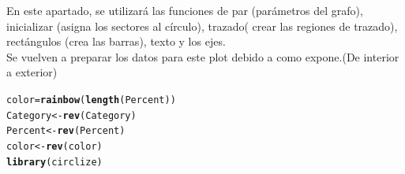 \documentclass{article}\usepackage[]{graphicx}\usepackage[]{color}
\makeatletter
\newcommand{\hlstd}[1]{\textcolor[rgb]{0.345,0.345,0.345}{#1}}%
\newcommand{\hlkwb}[1]{\textcolor[rgb]{0.69,0.353,0.396}{#1}}%
\newcommand{\hlkwd}[1]{\textcolor[rgb]{0.737,0.353,0.396}{\textbf{#1}}}%
\newenvironment{kframe}{%
 \def\at@end@of@kframe{}%
 \ifinner\ifhmode%
  \def\at@end@of@kframe{\end{minipage}}%
  \begin{minipage}{\columnwidth}%
 \fi\fi%
 \def\FrameCommand##1{\hskip\@totalleftmargin \hskip-\fboxsep
 \colorbox{shadecolor}{##1}\hskip-\fboxsep
     \hskip-\linewidth \hskip-\@totalleftmargin \hskip\columnwidth}%
 \MakeFramed {\advance\hsize-\width
   \@totalleftmargin\z@ \linewidth\hsize
   \@setminipage}}%
 {\par\unskip\endMakeFramed%
 \at@end@of@kframe}
\newenvironment{knitrout}{}{} %
\makeatother
\begin{document}
En este apartado, se utilizar\'a las funciones de par (par\'ametros del grafo), inicializar (asigna los sectores al c\'irculo),  trazado( crear las regiones de trazado), rect\'angulos (crea las barras), texto y los ejes.~\\
Se vuelven a preparar los datos para este plot debido a como expone.(De interior a exterior)
\begin{knitrout}
\color{fgcolor}\begin{kframe}
\begin{alltt}
\hlstd{color} \hlkwb{=} \hlkwd{rainbow}\hlstd{(}\hlkwd{length}\hlstd{(Percent))}
\hlstd{Category} \hlkwb{<-} \hlkwd{rev}\hlstd{(Category)}
\hlstd{Percent} \hlkwb{<-} \hlkwd{rev}\hlstd{(Percent)}
\hlstd{color} \hlkwb{<-} \hlkwd{rev}\hlstd{(color)}
\hlkwd{library}\hlstd{(circlize)}
\end{alltt}
\end{kframe}
\end{knitrout}
\clearpage
\end{document}
